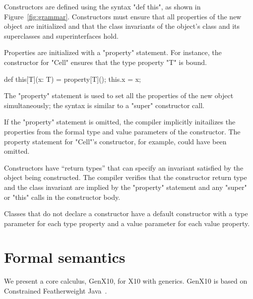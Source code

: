 \documentclass[preprint,nocopyrightspace,9pt]{sigplanconf}
\begin{document}
Constructors are defined using the syntax \xcd"def this",
as shown in Figure~\ref{fig:grammar}.
%
Constructors must ensure that all properties of the new object
are initialized and that the class invariants of the object's
class and its superclasses and superinterfaces hold.

Properties are initialized with a \xcd"property" statement.
For instance, the
constructor for \xcd"Cell" ensures that the type property \xcd"T" is bound.
\begin{xten}
    def this[T](x: T) =
      { property[T](); this.x = x; }
\end{xten}
The \xcd"property" statement is used to set all the properties
of the new object simultaneously; the syntax is similar to a \xcd"super"
constructor call.

If the \xcd"property" statement is omitted, the compiler implicitly
initailizes the properties from the formal type and value parameters
of the constructor.  The property statement for \xcd"Cell"'s constructor,
for example, could have been omitted.

Constructors have ``return
types'' that can specify an invariant satisfied by the object being
constructed.  The compiler verifies that the
constructor return type and the class invariant are implied by the
\xcd"property" statement and any \xcd"super"
or \xcd"this" calls in the constructor body.

Classes that do not declare a constructor
have a default constructor with a type parameter for each
type property and a value parameter for each value property.

\section{Formal semantics}

\newcommand\gxx{GenX10\xspace}
\newcommand\xbar[1]{\ensuremath{\bar{\Xcd{#1}}}}
\newcommand\tbar[1]{\ensuremath{\bar{\tt {#1}}}}
\newcommand\exc[2]{\ensuremath{\exists}#1.~#2}
\newcommand\exty[3]{\ensuremath{\exists}#1\ty#2.~#3}
\newcommand\extyty[5]{\ensuremath{\exists}#1\ty#2,#3\ty#4.~#5}
\newcommand\extytyty[7]{\ensuremath{\exists}#1\ty#2,#3\ty#4,#5\ty#6.~#7}

We present a core calculus, \gxx, for X10 with generics.
\gxx is based on Constrained Featherweight
Java~\cite{constrained-types}.

\end{document}
